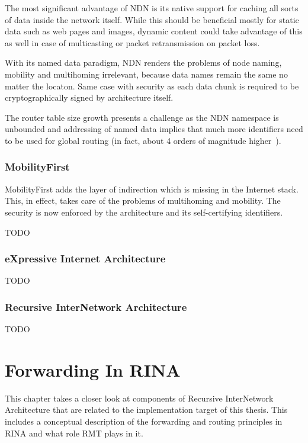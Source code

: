             The most significant advantage of NDN is its native support for caching all sorts of data inside the network itself. While this should be beneficial mostly for static data such as web pages and images, dynamic content could take advantage of this as well in case of multicasting or packet retransmission on packet loss.

            With its named data paradigm, NDN renders the problems of node naming, mobility and multihoming irrelevant, because data names remain the same no matter the locaton. Same case with security as each data chunk is required to be cryptographically signed by architecture itself.

            The router table size growth presents a challenge as the NDN namespace is unbounded and addressing of named data implies that much more identifiers need to be used for global routing (in fact, about 4 orders of magnitude higher~\cite{NDNvsMF}).

        \subsection{MobilityFirst}

            MobilityFirst adds the layer of indirection which is missing in the Internet stack. This, in effect, takes care of the problems of multihoming and mobility. The security is now enforced by the architecture and its self-certifying identifiers.

            TODO

        \subsection{eXpressive Internet Architecture}

            TODO

        \subsection{Recursive InterNetwork Architecture}

            TODO


\chapter{Forwarding In RINA}\label{forwarding}

    This chapter takes a closer look at components of Recursive InterNetwork Architecture that are related to the implementation target of this thesis. This includes a conceptual description of the forwarding and routing principles in RINA and what role RMT plays in it.

